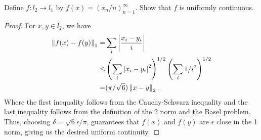 \begin{exercise}{67}
Define $f:l_2\to l_1$ by $f(x)=(x_n/n)_{n=1}^\infty$.
Show that $f$ is uniformly continuous.
\end{exercise}
\begin{proof}
For $x, y\in l_2$, we have
\begin{align*}
    \left\lVert f(x)-f(y)\right\rVert_1
    =& \sum_i \left\lvert \frac{x_i-y_i}{i}\right\rvert\\
    \leq& \left( \sum_i\left\lvert x_i-y_i\right\rvert^2\right)^{1/2} \left( \sum_i 1/i^2\right)^{1/2}\\
    =& (\pi/\sqrt{6})\left\lVert x-y\right\rVert_2.
\end{align*}
Where the first inequality follows from the Cauchy-Schwarz inequality and the last inequality follows from the definition of the 2 norm and the Basel problem.
Thus, choosing $\delta=\sqrt{6}\epsilon/\pi$, guarantees that $f(x)$ and $f(y)$ are $\epsilon$ close in the 1 norm, giving us the desired uniform continuity.
\end{proof} 

